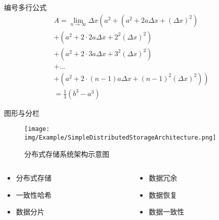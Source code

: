 \documentclass[aspectratio=169]{beamer}
\begin{document}
\begin{frame}{编号多行公式}
    \begin{multline}
        A=\lim_{n\rightarrow\infty}\Delta x\left(a^{2}+\left(a^{2}+2a\Delta x+\left(\Delta x\right)^{2}\right)\right.\label{eq:reset}\\
        +\left(a^{2}+2\cdot2a\Delta x+2^{2}\left(\Delta x\right)^{2}\right)\\
        +\left(a^{2}+2\cdot3a\Delta x+3^{2}\left(\Delta x\right)^{2}\right)\\
        +\ldots\\
        \left.+\left(a^{2}+2\cdot(n-1)a\Delta x+(n-1)^{2}\left(\Delta x\right)^{2}\right)\right)\\
        =\frac{1}{3}\left(b^{3}-a^{3}\right)
    \end{multline}
\end{frame}

\begin{frame}{图形与分栏}
    \begin{minipage}{0.5\textwidth}
        \begin{figure}[htpb]
            \centering
            \texttt{[image: img/Example/SimpleDistributedStorageArchitecture.png]}
            \caption{分布式存储系统架构示意图}
        \end{figure}
    \end{minipage}
    \hfill
    \begin{minipage}{0.4\textwidth}
        \begin{columns}[t]
            \begin{column}{0.5\textwidth}
                \begin{itemize}
                    \item 分布式存储
                    \item 一致性哈希
                    \item 数据分片
                \end{itemize}
            \end{column}
            \begin{column}{0.5\textwidth}
                \begin{itemize}
                    \item 数据冗余
                    \item 数据恢复
                    \item 数据一致性
                \end{itemize}
            \end{column}
        \end{columns}
    \end{minipage}
\end{frame}
\end{document}
